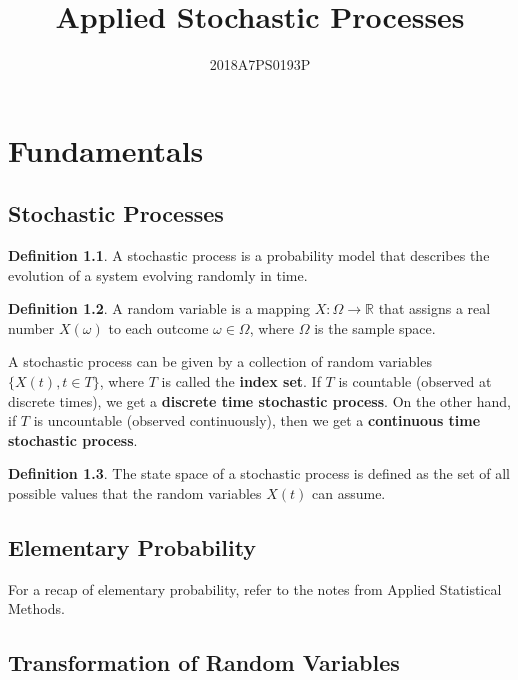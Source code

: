 \documentclass[12pt,letterpaper]{book}
\title{Applied Stochastic Processes}
\author{2018A7PS0193P}
\theoremstyle{definition}
\newtheorem{definition}{Definition}%
\newcommand{\R}{\mathbb{R}}
\begin{document}
\maketitle

\chapter{Fundamentals}

\section{Stochastic Processes}

\begin{definition}
  A stochastic process is a probability model that describes the evolution of a system evolving randomly in time.
\end{definition}

\begin{definition}
  A random variable is a mapping $X : \Omega \rightarrow \R$ that assigns a real number $X(\omega)$ to each outcome $\omega \in \Omega$, where $\Omega$ is the sample space.
\end{definition}

A stochastic process can be given by a collection of random variables $\{X(t), t \in T\}$, where $T$ is called the \textbf{index set}. If $T$ is countable (observed at discrete times), we get a \textbf{discrete time stochastic process}. On the other hand, if $T$ is uncountable (observed continuously), then we get a \textbf{continuous time stochastic process}.

\begin{definition}
  The state space  of a stochastic process is defined as the set of all possible values that the random variables $X(t)$ can assume.
\end{definition}

\section{Elementary Probability}

For a recap of elementary probability, refer to the notes from Applied Statistical Methods.

\section{Transformation of Random Variables}

\phantom{Invisible text to fix mdframe, I don't want to switch to tcolorbox}
\end{document}
